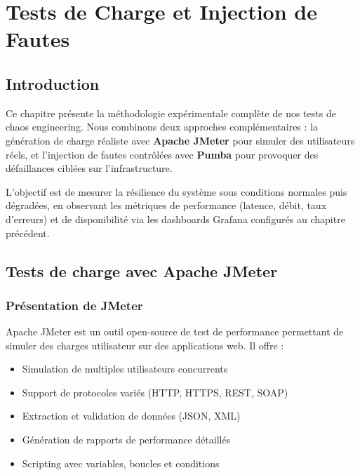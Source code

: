 \chapter{Tests de Charge et Injection de Fautes}
\label{chap:tests-chaos}

\section{Introduction}

Ce chapitre présente la méthodologie expérimentale complète de nos tests de chaos engineering. Nous combinons deux approches complémentaires : la génération de charge réaliste avec \textbf{Apache JMeter} pour simuler des utilisateurs réels, et l'injection de fautes contrôlées avec \textbf{Pumba} pour provoquer des défaillances ciblées sur l'infrastructure.

L'objectif est de mesurer la résilience du système sous conditions normales puis dégradées, en observant les métriques de performance (latence, débit, taux d'erreurs) et de disponibilité via les dashboards Grafana configurés au chapitre précédent.

\section{Tests de charge avec Apache JMeter}

\subsection{Présentation de JMeter}

Apache JMeter est un outil open-source de test de performance permettant de simuler des charges utilisateur sur des applications web. Il offre :
\begin{itemize}
    \item Simulation de multiples utilisateurs concurrents
    \item Support de protocoles variés (HTTP, HTTPS, REST, SOAP)
    \item Extraction et validation de données (JSON, XML)
    \item Génération de rapports de performance détaillés
    \item Scripting avec variables, boucles et conditions
\end{itemize}

